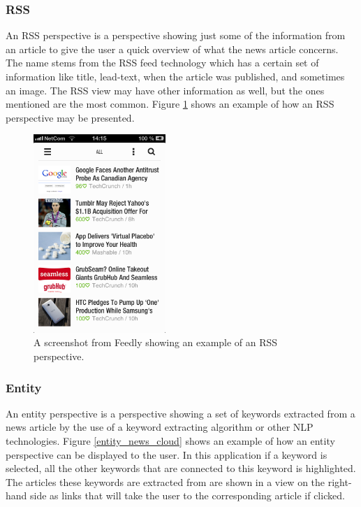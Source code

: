 \subsubsection{RSS}
An RSS perspective is a perspective showing just some of the information from an article to give the user a quick overview of what the news article concerns. The name stems from the RSS feed technology which has a certain set of information like title, lead-text, when the article was published, and sometimes an image. The RSS view may have other information as well, but the ones mentioned are the most common. Figure \ref{rss_feedly} shows an example of how an RSS perspective may be presented.

\begin{figure}[!htbp]
\centering
\includegraphics[width=50mm]{GFX/perspectives/rssViewFeedly.png}
\caption{A screenshot from Feedly showing an example of an RSS perspective.}
\label{rss_feedly}
\end{figure}

\subsubsection{Entity}
An entity perspective is a perspective showing a set of keywords extracted from a news article by the use of a keyword extracting algorithm or other NLP technologies. Figure \ref{entity_news_cloud} shows an example of how an entity perspective can be displayed to the user. In this application if a keyword is selected, all the other keywords that are connected to this keyword is highlighted. The articles these keywords are extracted from are shown in a view on the right-hand side as links that will take the user to the corresponding article if clicked.

